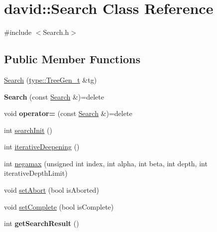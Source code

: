 \hypertarget{classdavid_1_1Search}{}\section{david\+:\+:Search Class Reference}
\label{classdavid_1_1Search}


{\ttfamily \#include $<$Search.\+h$>$}

\subsection*{Public Member Functions}
\begin{DoxyCompactItemize}
\item 
\hyperlink{classdavid_1_1Search_a2a037825dc7f3bf6d4d9c1e06c0c1848}{Search} (\hyperlink{classdavid_1_1gameTree_1_1TreeGen}{type\+::\+Tree\+Gen\+\_\+t} \&tg)
\item 
\mbox{\label{classdavid_1_1Search_a3a6e4319d8d73e068ff464b7f9c1dbee}} 
{\bfseries Search} (const \hyperlink{classdavid_1_1Search}{Search} \&)=delete
\item 
\mbox{\label{classdavid_1_1Search_ada79fe6a57039fc0845fc2b32ebe52e0}} 
void {\bfseries operator=} (const \hyperlink{classdavid_1_1Search}{Search} \&)=delete
\item 
int \hyperlink{classdavid_1_1Search_a2369363341b57c68fcef39a5be57221b}{search\+Init} ()
\item 
int \hyperlink{classdavid_1_1Search_a77bf5a13cdb27c44f1c3abf26c0be0b5}{iterative\+Deepening} ()
\item 
int \hyperlink{classdavid_1_1Search_a4ce0b048c7b1a1beebfe033d92622ba4}{negamax} (unsigned int index, int alpha, int beta, int depth, int iterative\+Depth\+Limit)
\item 
void \hyperlink{classdavid_1_1Search_acdd60c4222d2c63d07e8576faf5a34fd}{set\+Abort} (bool is\+Aborted)
\item 
void \hyperlink{classdavid_1_1Search_ad473d052f9123762c1636ef04a7ecdde}{set\+Complete} (bool is\+Complete)
\item 
\mbox{\label{classdavid_1_1Search_ada3fc61b63f35aaf5a5a5e177b08d93f}} 
int {\bfseries get\+Search\+Result} ()
\item 
\mbox{\label{classdavid_1_1Search_a17bee32484445f77cdc1de6d0e7256b6}} 

\end{DoxyCompactItemize}
